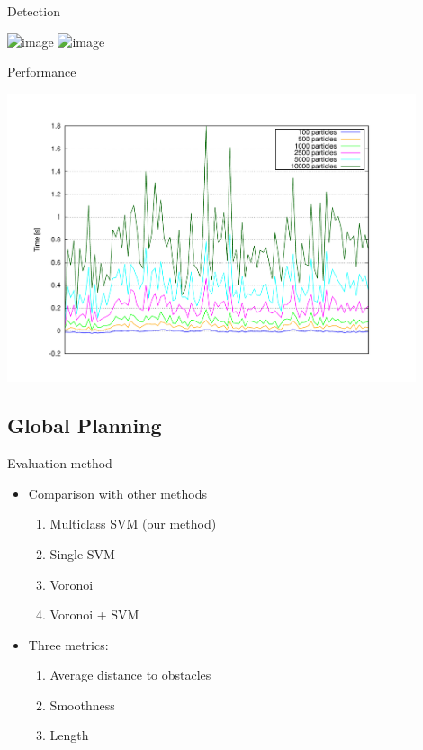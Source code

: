 \begin{frame}{Detection}
  \begin{center}
    \includegraphics<1>[width=0.9\textwidth,trim=50 40 80 60,clip]{recall}
    \includegraphics<2>[width=0.9\textwidth,trim=50 40 80 60,clip]{precision}
  \end{center}
\end{frame}

\begin{frame}{Performance}
  \begin{center}
    \includegraphics[width=0.9\textwidth,trim=50 50 90 60, clip]{timesVsParticles}
  \end{center}
\end{frame}

\subsection{Global Planning}

\begin{frame}{Evaluation method}
  \begin{itemize}
    \item Comparison with other methods
    \begin{enumerate}
      \item Multiclass SVM (our method)
      \item Single SVM \citep{miura2006support}
      \item Voronoi
      \item Voronoi + SVM \citep{yang2012safe}
    \end{enumerate}
    \item Three metrics:
    \begin{enumerate}
      \item Average distance to obstacles
      \item Smoothness
      \item Length
    \end{enumerate}
  \end{itemize}
\end{frame}

